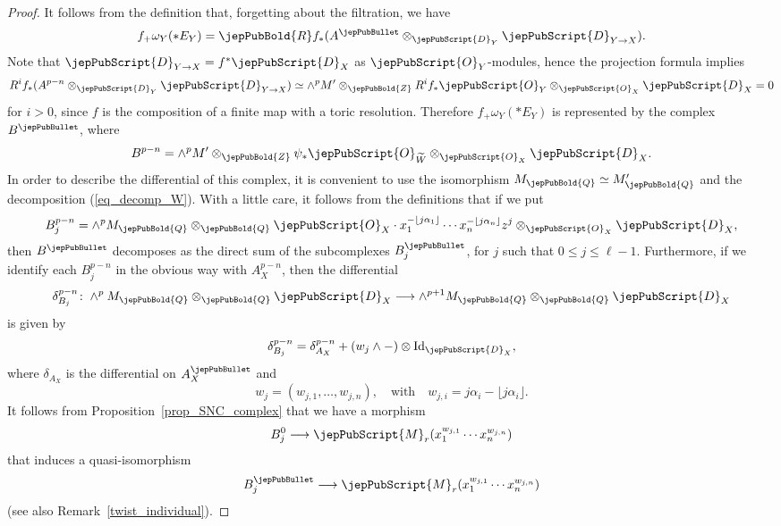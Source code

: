 \begin{proof}
It follows from the definition that,  forgetting about the filtration, we have
$$f_+\omega_Y(*E_Y)=\jepPubBold{R} f_*(A^{\jepPubBullet}\otimes_{\jepPubScript{D}_Y}\jepPubScript{D}_{Y\to X}).$$
Note that $\jepPubScript{D}_{Y\to X}=f^* \jepPubScript{D}_X$ as $\jepPubScript{O}_Y$-modules, hence the projection formula implies
$$R^if_*(A^{p-n}\otimes_{\jepPubScript{D}_Y}\jepPubScript{D}_{Y\to X})\simeq \wedge^pM'\otimes_{\jepPubBold{Z}}R^if_*\jepPubScript{O}_Y\otimes_{\jepPubScript{O}_X}\jepPubScript{D}_X=0$$
for $i>0$, since $f$ is the composition of a finite map with a toric resolution. Therefore 
$f_+\omega_Y(*E_Y)$ is represented by the complex $B^{\jepPubBullet}$, where
$$B^{p-n}=\wedge^pM'\otimes_{\jepPubBold{Z}}\psi_*\jepPubScript{O}_{\widetilde{W}}\otimes_{\jepPubScript{O}_X}\jepPubScript{D}_X.$$
In order to describe the differential of this complex, it is convenient to use the isomorphism $M_{\jepPubBold{Q}}\simeq M'_{\jepPubBold{Q}}$
and the decomposition (\ref{eq_decomp_W}). With a little care, it follows from the definitions that if we put
$$B^{p-n}_j=\wedge^pM_{\jepPubBold{Q}}\otimes_{\jepPubBold{Q}}\jepPubScript{O}_X\cdot x_1^{-\lfloor j\alpha_1\rfloor}\cdots x_n^{-\lfloor j\alpha_n\rfloor}z^j\otimes
_{\jepPubScript{O}_X}\jepPubScript{D}_X,$$
then $B^{\jepPubBullet}$ decomposes as the direct sum of the subcomplexes $B^{\jepPubBullet}_j$, for $j$ such that $0\leqslant j\leqslant \ell-1$. 
Furthermore, if we identify each $B^{p-n}_j$ in the obvious way with $A^{p-n}_X$, then the differential 
$$\delta_{B_j}^{p-n}\colon \wedge^pM_{\jepPubBold{Q}}\otimes_{\jepPubBold{Q}}\jepPubScript{D}_X\longrightarrow \wedge^{p+1} M_{\jepPubBold{Q}}\otimes_{\jepPubBold{Q}}\jepPubScript{D}_X$$
is given by 
$$\delta_{B_j}^{p-n}=\delta_{A_X}^{p-n}+(w_j \wedge -)\otimes {\rm Id}_{\jepPubScript{D}_X},$$
where $\delta_{A_X}$ is the differential on $A_X^{\jepPubBullet}$ and
$$w_j=(w_{j,1},\ldots,w_{j,n}),\quad\text{with}\quad w_{j,i}=j\alpha_i-\lfloor j\alpha_i\rfloor.$$
It follows from Proposition~\ref{prop_SNC_complex} that we have a morphism
$$B_j^0\longrightarrow \jepPubScript{M}_r(x_1^{w_{j,1}}\cdots x_n^{w_{j,n}})$$ 
that induces a quasi-isomorphism
$$B_j^{\jepPubBullet}\longrightarrow \jepPubScript{M}_r(x_1^{w_{j,1}}\cdots x_n^{w_{j,n}})$$
(see also Remark~\ref{twist_individual}).


\end{proof}
